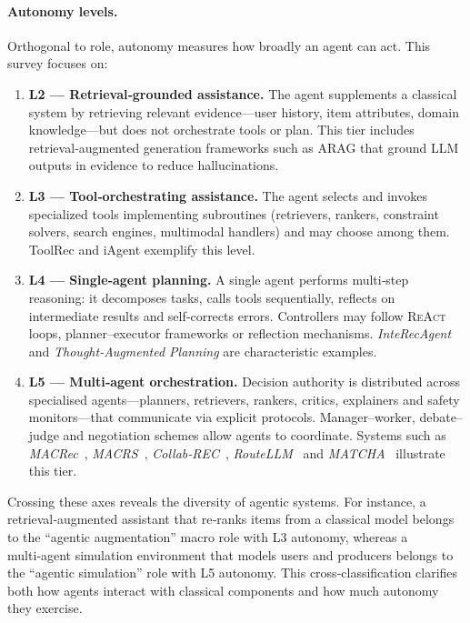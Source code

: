 \paragraph{\textbf{Autonomy levels.}} Orthogonal to role, autonomy measures how broadly an agent can act.  This survey focuses on:
\begin{enumerate}
  \item \textbf{L2 — Retrieval‑grounded assistance.}  The agent supplements a classical system by retrieving relevant evidence—user history, item attributes, domain knowledge—but does not orchestrate tools or plan.  This tier includes retrieval‑augmented generation frameworks such as ARAG that ground LLM outputs in evidence to reduce hallucinations.
  \item \textbf{L3 — Tool‑orchestrating assistance.}  The agent selects and invokes specialized tools implementing subroutines (retrievers, rankers, constraint solvers, search engines, multimodal handlers) and may choose among them.  ToolRec and iAgent exemplify this level.
  \item \textbf{L4 — Single‑agent planning.}  A single agent performs multi‑step reasoning: it decomposes tasks, calls tools sequentially, reflects on intermediate results and self‑corrects errors.  Controllers may follow \textsc{ReAct} loops, planner–executor frameworks or reflection mechanisms.  \emph{InteRecAgent} and \emph{Thought‑Augmented Planning} are characteristic examples.
  \item \textbf{L5 — Multi‑agent orchestration.}  Decision authority is distributed across specialised agents—planners, retrievers, rankers, critics, explainers and safety monitors—that communicate via explicit protocols.  Manager–worker, debate–judge and negotiation schemes allow agents to coordinate.  Systems such as \emph{MACRec}~\cite{macrec}, \emph{MACRS}~\cite{fang2024multi}, \emph{Collab‑REC}~\cite{banerjee2025collab}, \emph{RouteLLM}~\cite{zhe2025constraint} and \emph{MATCHA}~\cite{hui2025matcha} illustrate this tier.
\end{enumerate}

Crossing these axes reveals the diversity of agentic systems.  For instance, a retrieval‑augmented assistant that re‑ranks items from a classical model belongs to the “agentic augmentation” macro role with L3 autonomy, whereas a multi‑agent simulation environment that models users and producers belongs to the “agentic simulation” role with L5 autonomy.  This cross‑classification clarifies both how agents interact with classical components and how much autonomy they exercise.

